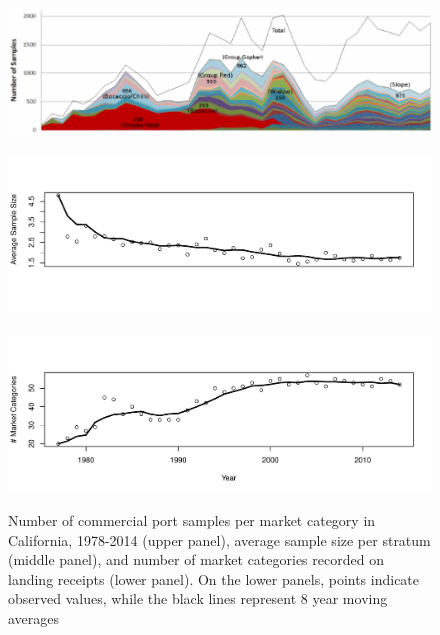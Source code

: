 \documentclass[12pt]{article}
\begin{document}
%
\begin{figure}[h!]
\centering
\includegraphics[width=\textwidth]{./pictures/mcatColors.png}
$~$\\
\vspace*{-2cm}
\hspace*{-0.3cm}
\includegraphics[width=1.055\textwidth]{./pictures/stratAvgSamp.pdf}
$~$\\
\vspace*{-3.8cm}
\hspace*{-0.3cm}
\includegraphics[width=1.055\textwidth]{./pictures/nMcatsEMA.pdf}
\caption{Number of commercial port samples per market
category in California, 1978-2014 (upper panel), average sample size per
stratum (middle panel), and number of market categories recorded on
landing receipts (lower panel). On the lower panels, points indicate
observed values, while the black lines represent 8 year moving averages}
\label{sparceData}
\end{figure}
\end{document}
